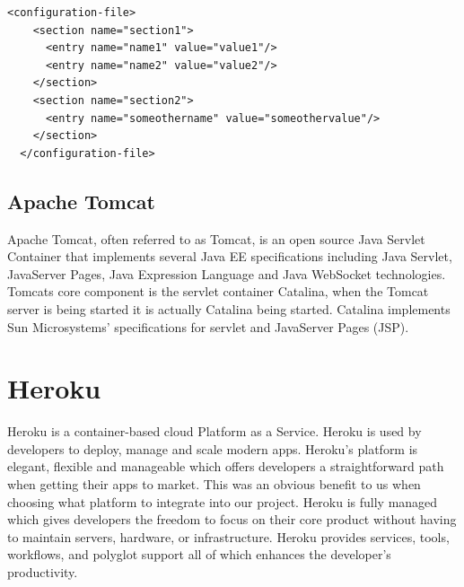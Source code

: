 \begin{verbatim}
<configuration-file>
    <section name="section1">
      <entry name="name1" value="value1"/>
      <entry name="name2" value="value2"/>
    </section>
    <section name="section2">
      <entry name="someothername" value="someothervalue"/>
    </section>
  </configuration-file>
\end{verbatim}

\subsection{Apache Tomcat}
Apache Tomcat, often referred to as Tomcat, is an open source Java Servlet Container that implements several Java EE specifications including Java Servlet, JavaServer Pages, Java Expression Language and Java WebSocket technologies\cite{ApacheTomcat}. Tomcats core component is the servlet container Catalina, when the Tomcat server is being started it is actually Catalina being started. Catalina implements Sun Microsystems' specifications for servlet and JavaServer Pages (JSP).

\section{Heroku}
Heroku is a container-based cloud Platform as a Service. Heroku is used by developers to deploy, manage and scale modern apps. Heroku’s platform is elegant, flexible and manageable which offers developers a straightforward path when getting their apps to market. This was an obvious benefit to us when choosing what platform to integrate into our project. Heroku is fully managed which gives developers the freedom to focus on their core product without having to maintain servers, hardware, or infrastructure. Heroku provides services, tools, workflows, and polyglot support all of which enhances the developer’s productivity\cite{Heroku}.
 

